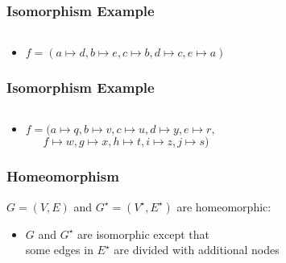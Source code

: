 \documentclass[dvipsnames]{beamer}
\begin{document}
\begin{frame}
  \frametitle{Isomorphism Example}

  \begin{example}
    \begin{columns}
      \begin{center}
      \end{center}

      \begin{center}
      \end{center}
    \end{columns}

    \pause
    \bigskip
    \begin{itemize}
      \item $f = (a \mapsto d, b \mapsto e, c \mapsto b, d \mapsto c,
        e \mapsto a)$
    \end{itemize}
  \end{example}
\end{frame}

\begin{frame}
  \frametitle{Isomorphism Example}

  \begin{example}
    \begin{columns}
      \begin{center}
      \end{center}

      \begin{center}
      \end{center}
    \end{columns}

    \bigskip
    \begin{itemize}
      \item $f = (a \mapsto q, b \mapsto v, c \mapsto u, d \mapsto y,
          e \mapsto r,$\\
        $~~~~~~~f \mapsto w, g \mapsto x, h \mapsto t, i \mapsto z,
          j \mapsto s)$
    \end{itemize}
  \end{example}
\end{frame}

\begin{frame}
  \frametitle{Homeomorphism}

  \begin{definition}
    $G=(V,E)$ and $G^\star=(V^\star,E^\star)$ are \alert{homeomorphic}:
    \begin{itemize}
      \item $G$ and $G^\star$ are isomorphic except that\\
        some edges in $E^\star$ are divided with additional nodes
    \end{itemize}
  \end{definition}
\end{frame}
\end{document}
